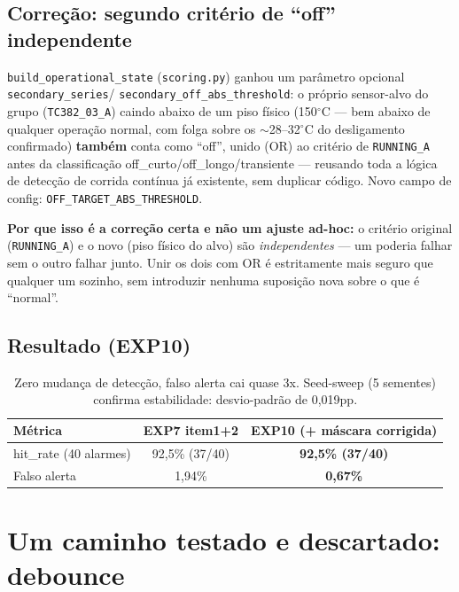 \documentclass[11pt,a4paper]{article}
\begin{document}
\subsection{Correção: segundo critério de ``off'' independente}

\texttt{build\_operational\_state} (\texttt{scoring.py}) ganhou um
parâmetro opcional \texttt{secondary\_series}/
\texttt{secondary\_off\_abs\_threshold}: o próprio sensor-alvo do grupo
(\texttt{TC382\_03\_A}) caindo abaixo de um piso físico (150$^{\circ}$C
--- bem abaixo de qualquer operação normal, com folga sobre os
$\sim$28--32$^{\circ}$C do desligamento confirmado) \textbf{também} conta
como ``off'', unido (OR) ao critério de \texttt{RUNNING\_A} antes da
classificação off\_curto/off\_longo/transiente --- reusando toda a lógica
de detecção de corrida contínua já existente, sem duplicar código. Novo
campo de config: \texttt{OFF\_TARGET\_ABS\_THRESHOLD}.

\textbf{Por que isso é a correção certa e não um ajuste ad-hoc:} o
critério original (\texttt{RUNNING\_A}) e o novo (piso físico do alvo)
são \emph{independentes} --- um poderia falhar sem o outro falhar junto.
Unir os dois com OR é estritamente mais seguro que qualquer um sozinho,
sem introduzir nenhuma suposição nova sobre o que é ``normal''.

\subsection{Resultado (EXP10)}

\begin{table}[H]
\centering
\begin{tabular}{@{}lcc@{}}
\toprule
\textbf{Métrica} & \textbf{EXP7 item1+2} & \textbf{EXP10 (+ máscara corrigida)} \\
\midrule
hit\_rate (40 alarmes) & 92,5\% (37/40) & \textbf{92,5\% (37/40)} \\
Falso alerta & 1,94\% & \textbf{0,67\%} \\
\bottomrule
\end{tabular}
\caption{Zero mudança de detecção, falso alerta cai quase 3x. Seed-sweep
(5 sementes) confirma estabilidade: desvio-padrão de 0,019pp.}
\end{table}

\section{Um caminho testado e descartado: debounce}
\label{sec:debounce}
\end{document}
